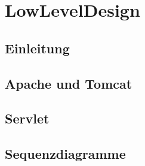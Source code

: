 \documentclass{scrbook}
\begin{document}
\frontmatter
\maketitle
\tableofcontents
\mainmatter

\setcounter{part}{1}
\part{LowLevelDesign}
\chapter*{Einleitung}

\chapter{Apache und Tomcat}
 
\chapter{Servlet}

\chapter{Sequenzdiagramme}

\end{document}
